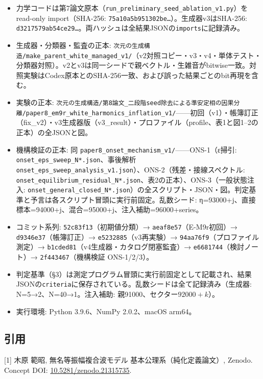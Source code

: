 \documentclass[
  a4paper,
]{ltjsarticle}
\providecommand{\tightlist}{%
  \setlength{\itemsep}{0pt}\setlength{\parskip}{0pt}}
\begin{document}
\begin{itemize}
\tightlist
\item
  力学コードは第7論文原本（\texttt{run\_preliminary\_seed\_ablation\_v1.py}）をread-only
  import（SHA-256: \texttt{75a10a5b951302be…}）。生成器v3はSHA-256:
  \texttt{d3217579ab54ce29…}。両ハッシュは全結果JSONの\texttt{imports}に記録済み。
\item
  生成器・分類器・監査の正本:
  \texttt{次元の生成構造/make\_parent\_white\_managed\_v1/}（v2対照コピー・v3・v4・単体テスト・分類器対照）。v2とv3は同一シードで親ベクトル・生雑音がbitwise一致。対照実験はCodex原本とのSHA-256一致、および誤った結果ごとのbit再現を含む。
\item
  実験の正本:
  \texttt{次元の生成構造/第8論文\_二段階seed除去による準安定相の因果分離/paper8\_em9r\_white\_harmonics\_inflation\_v1/}------初回（v1）・帳簿訂正（fix\_v2）・v3生成器版（v3\_result）・プロファイル（profile、表1と図1--2の正本）の全JSONと図。
\item
  機構検証の正本: 同
  \texttt{paper8\_onset\_mechanism\_v1/}------ONS-1（ε掃引:
  \texttt{onset\_eps\_sweep\_N*.json}、事後解析
  \texttt{onset\_eps\_sweep\_analysis\_v1.json}）、ONS-2（残差・接線スペクトル:
  \texttt{onset\_equilibrium\_residual\_N*.json}、表2の正本）、ONS-3（一般状態注入:
  \texttt{onset\_general\_closed\_N*.json}）の全スクリプト・JSON・図。判定基準と予言は各スクリプト冒頭に実行前固定。乱数シード:
  η=93000+j、直接標本=94000+j、混合=95000+j、注入補助=96000+series。
\item
  コミット系列: \texttt{52c83f13}（初期値分類）→
  \texttt{aeaf8e57}（E-M9r初回）→ \texttt{d9346e37}（帳簿訂正）→
  \texttt{e5232885}（v3再実験）→ \texttt{94aa76f9}（プロファイル測定）→
  \texttt{b1cded81}（v4生成器・カタログ閉塞監査）→
  \texttt{e6681744}（検討ノート）→ \texttt{2f443467}（機構検証
  ONS-1/2/3）。
\item
  判定基準（§3）は測定プログラム冒頭に実行前固定として記載され、結果JSONの\texttt{criteria}に保存されている。乱数シードは全て記録済み（生成器:
  N=5→2、N=40→1。注入補助: 親91000、セクター\(92000+k\)）。
\item
  実行環境: Python 3.9.6、NumPy 2.0.2、macOS arm64。
\end{itemize}

\subsection{引用}\label{ux5f15ux7528}

{[}1{]} 木原 範昭, 無名等振幅複合波モデル 基本公理系（純化定義論文）,
Zenodo. Concept DOI:
\href{https://doi.org/10.5281/zenodo.21315735}{10.5281/zenodo.21315735}.
\end{document}
